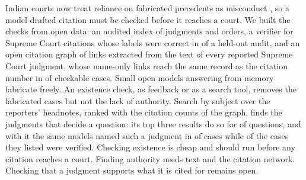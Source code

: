 Indian courts now treat reliance on fabricated precedents as misconduct \cite{gummadi}, so a model-drafted citation must be checked before it reaches a court. We built the checks from open data: an audited index of \CorpusTotal{} judgments and orders, a verifier for Supreme Court citations whose labels were correct in \AuditPct{} of a held-out audit, and an open citation graph of \GraphEdges{} links extracted from the text of every reported Supreme Court judgment, whose name-only links reach the same record as the citation number in \GraphNameSamePct{} of checkable cases. Small open models answering from memory fabricate freely. An existence check, as feedback or as a search tool, removes the fabricated cases but not the lack of authority. Search by subject over the reporters' headnotes, ranked with the citation counts of the graph, finds the judgments that decide a question: its top three results do so for \QHybridPriorHitThree{} of \NumTopics{} questions, and with it the same models named such a judgment in \RefAllTopicPrior{} of \RefQuestionsAll{} cases while \VerPctAllTopicPrior{} of the cases they listed were verified. Checking existence is cheap and should run before any citation reaches a court. Finding authority needs text and the citation network. Checking that a judgment supports what it is cited for remains open.
